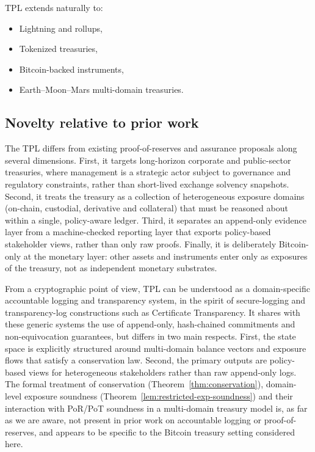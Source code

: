 \documentclass[11pt]{article}
\begin{document}
TPL extends naturally to:

\begin{itemize}[noitemsep]
\item Lightning and rollups,
\item Tokenized treasuries,
\item Bitcoin-backed instruments,
\item Earth--Moon--Mars multi-domain treasuries.
\end{itemize}

\subsection{Novelty relative to prior work}

The TPL differs from existing proof-of-reserves and assurance proposals along several dimensions.
First, it targets long-horizon corporate and public-sector treasuries, where management is a
strategic actor subject to governance and regulatory constraints, rather than short-lived exchange
solvency snapshots.
Second, it treats the treasury as a collection of heterogeneous exposure domains (on-chain,
custodial, derivative and collateral) that must be reasoned about within a single, policy-aware
ledger.
Third, it separates an append-only evidence layer from a machine-checked reporting layer that
exports policy-based stakeholder views, rather than only raw proofs.
Finally, it is deliberately Bitcoin-only at the monetary layer: other assets and instruments enter
only as exposures of the treasury, not as independent monetary substrates.

From a cryptographic point of view, TPL can be understood as a domain-specific accountable logging
and transparency system, in the spirit of secure-logging and transparency-log constructions such as
Certificate Transparency.
It shares with these generic systems the use of append-only, hash-chained commitments and
non-equivocation guarantees, but differs in two main respects.
First, the state space is explicitly structured around multi-domain balance vectors and exposure
flows that satisfy a conservation law.
Second, the primary outputs are policy-based views for heterogeneous stakeholders rather than raw
append-only logs.
The formal treatment of conservation (Theorem~\ref{thm:conservation}), domain-level exposure
soundness (Theorem~\ref{lem:restricted-exp-soundness}) and their interaction with PoR/PoT soundness
in a multi-domain treasury model is, as far as we are aware, not present in prior work on
accountable logging or proof-of-reserves, and appears to be specific to the Bitcoin treasury setting
considered here.
\end{document}
